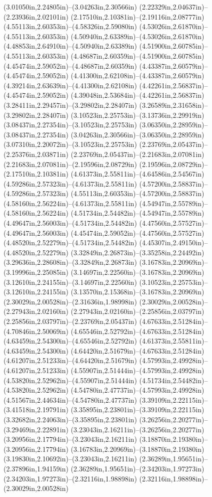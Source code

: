 (3.01050in,2.24805in)--(3.04263in,2.30566in) (2.22329in,2.04637in)--(2.23936in,2.02101in) (2.17510in,2.10381in)--(2.19116in,2.08777in) (4.55113in,2.60353in)--(4.58326in,2.59080in) (4.53026in,2.61870in)--(4.55113in,2.60353in) (4.50940in,2.63389in)--(4.53026in,2.61870in) (4.48853in,2.64910in)--(4.50940in,2.63389in) (4.51900in,2.60785in)--(4.55113in,2.60353in) (4.48687in,2.60359in)--(4.51900in,2.60785in) (4.45474in,2.59052in)--(4.48687in,2.60359in) (4.43387in,2.60579in)--(4.45474in,2.59052in) (4.41300in,2.62108in)--(4.43387in,2.60579in) (4.39214in,2.63639in)--(4.41300in,2.62108in) (4.42261in,2.56837in)--(4.45474in,2.59052in) (4.39048in,2.53684in)--(4.42261in,2.56837in) (3.28411in,2.29457in)--(3.29802in,2.28407in) (3.26589in,2.31658in)--(3.29802in,2.28407in) (3.10523in,2.25753in)--(3.13736in,2.29919in) (3.08437in,2.27354in)--(3.10523in,2.25753in) (3.06350in,2.28959in)--(3.08437in,2.27354in) (3.04263in,2.30566in)--(3.06350in,2.28959in) (3.07310in,2.20072in)--(3.10523in,2.25753in) (2.23769in,2.05437in)--(2.25376in,2.03871in) (2.23769in,2.05437in)--(2.21683in,2.07081in) (2.21683in,2.07081in)--(2.19596in,2.08729in) (2.19596in,2.08729in)--(2.17510in,2.10381in) (4.61373in,2.55811in)--(4.64586in,2.54567in) (4.59286in,2.57323in)--(4.61373in,2.55811in) (4.57200in,2.58837in)--(4.59286in,2.57323in) (4.55113in,2.60353in)--(4.57200in,2.58837in) (4.58160in,2.56224in)--(4.61373in,2.55811in) (4.54947in,2.55789in)--(4.58160in,2.56224in) (4.51734in,2.54482in)--(4.54947in,2.55789in) (4.49647in,2.56003in)--(4.51734in,2.54482in) (4.47560in,2.57527in)--(4.49647in,2.56003in) (4.45474in,2.59052in)--(4.47560in,2.57527in) (4.48520in,2.52279in)--(4.51734in,2.54482in) (4.45307in,2.49150in)--(4.48520in,2.52279in) (3.32849in,2.26873in)--(3.35258in,2.24492in) (3.29636in,2.28608in)--(3.32849in,2.26873in) (3.16783in,2.20969in)--(3.19996in,2.25085in) (3.14697in,2.22560in)--(3.16783in,2.20969in) (3.12610in,2.24155in)--(3.14697in,2.22560in) (3.10523in,2.25753in)--(3.12610in,2.24155in) (3.13570in,2.15368in)--(3.16783in,2.20969in) (2.30029in,2.00528in)--(2.31636in,1.98998in) (2.30029in,2.00528in)--(2.27943in,2.02160in) (2.27943in,2.02160in)--(2.25856in,2.03797in) (2.25856in,2.03797in)--(2.23769in,2.05437in) (4.67633in,2.51284in)--(4.70846in,2.50069in) (4.65546in,2.52792in)--(4.67633in,2.51284in) (4.63459in,2.54300in)--(4.65546in,2.52792in) (4.61373in,2.55811in)--(4.63459in,2.54300in) (4.64420in,2.51679in)--(4.67633in,2.51284in) (4.61207in,2.51233in)--(4.64420in,2.51679in) (4.57993in,2.49928in)--(4.61207in,2.51233in) (4.55907in,2.51444in)--(4.57993in,2.49928in) (4.53820in,2.52962in)--(4.55907in,2.51444in) (4.51734in,2.54482in)--(4.53820in,2.52962in) (4.54780in,2.47737in)--(4.57993in,2.49928in) (4.51567in,2.44634in)--(4.54780in,2.47737in) (3.39109in,2.22115in)--(3.41518in,2.19791in) (3.35895in,2.23801in)--(3.39109in,2.22115in) (3.32682in,2.24063in)--(3.35895in,2.23801in) (3.26256in,2.20277in)--(3.29469in,2.22891in) (3.23043in,2.16211in)--(3.26256in,2.20277in) (3.20956in,2.17794in)--(3.23043in,2.16211in) (3.18870in,2.19380in)--(3.20956in,2.17794in) (3.16783in,2.20969in)--(3.18870in,2.19380in) (3.19830in,2.10692in)--(3.23043in,2.16211in) (2.36289in,1.95651in)--(2.37896in,1.94159in) (2.36289in,1.95651in)--(2.34203in,1.97273in) (2.34203in,1.97273in)--(2.32116in,1.98898in) (2.32116in,1.98898in)--(2.30029in,2.00528in) 